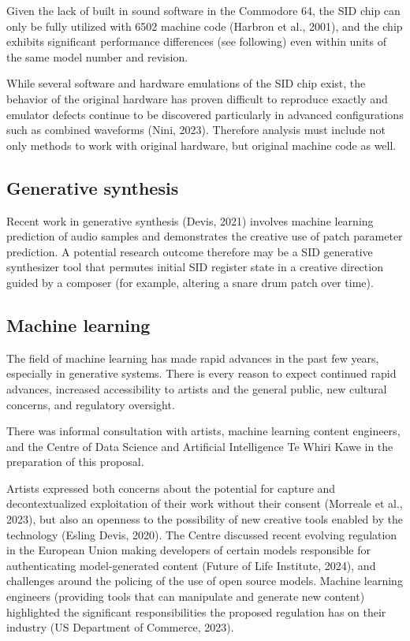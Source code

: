 \documentclass[10pt]{article}
\begin{document}
\begin{multicols*}{2}
Given the lack of built in sound software in the Commodore 64, the SID chip can only be fully utilized with 6502 machine code (Harbron et al., 2001), and the chip exhibits significant performance differences (see following) even within units of the same model number and revision.

While several software and hardware emulations of the SID chip exist, the behavior of the original hardware has proven difficult to reproduce exactly and emulator defects continue to be discovered particularly in advanced configurations such as combined waveforms (Nini, 2023). Therefore analysis must include not only methods to work with original hardware, but original machine code as well.

\subsection{Generative synthesis}

Recent work in generative synthesis (Devis, 2021) involves machine learning prediction of audio samples and demonstrates the creative use of patch parameter prediction. A potential research outcome therefore may be a SID generative synthesizer tool that permutes initial SID register state in a creative direction guided by a composer (for example, altering a snare drum patch over time).

\subsection{Machine learning}

The field of machine learning has made rapid advances in the past few years, especially in generative systems. There is every reason to expect continued rapid advances, increased accessibility to artists and the general public, new cultural concerns, and regulatory oversight.

There was informal consultation with artists, machine learning content engineers, and the Centre of Data Science and Artificial Intelligence Te Whiri Kawe in the preparation of this proposal.

Artists expressed both concerns about the potential for capture and decontextualized exploitation of their work without their consent (Morreale et al., 2023), but also an openness to the possibility of new creative tools enabled by the technology (Esling Devis, 2020). The Centre discussed recent evolving regulation in the European Union making developers of certain models responsible for authenticating model-generated content (Future of Life Institute, 2024), and challenges around the policing of the use of open source models. Machine learning engineers (providing tools that can manipulate and generate new content) highlighted the significant responsibilities the proposed regulation has on their industry (US Department of Commerce, 2023).


\end{multicols*}
\end{document}
